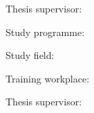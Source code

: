 

Thesis supervisor: \mySupervisor


\medskip{}

\myDate


\clearpage





Study programme: \FIITstudyProgram

Study field: \FIITstudyField

Training workplace: \FIITinstitute

Thesis supervisor: \mySupervisor

\medskip{}

\myDate

\clearpage

